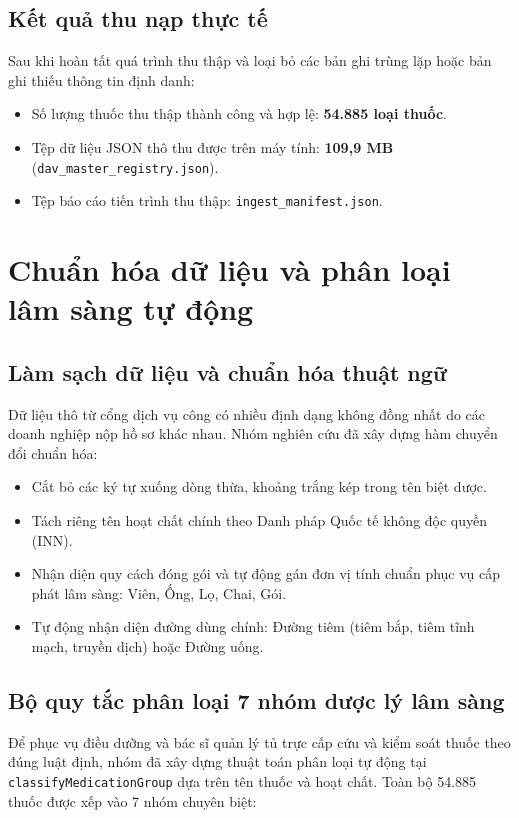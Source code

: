 \documentclass[12pt,a4paper]{article}
\begin{document}
\subsection{Kết quả thu nạp thực tế}
Sau khi hoàn tất quá trình thu thập và loại bỏ các bản ghi trùng lặp hoặc bản ghi thiếu thông tin định danh:
\begin{itemize}[leftmargin=1.5em]
    \item Số lượng thuốc thu thập thành công và hợp lệ: \textbf{54.885 loại thuốc}.
    \item Tệp dữ liệu JSON thô thu được trên máy tính: \textbf{109,9 MB} (\texttt{dav\_master\_registry.json}).
    \item Tệp báo cáo tiến trình thu thập: \texttt{ingest\_manifest.json}.
\end{itemize}

\section{Chuẩn hóa dữ liệu và phân loại lâm sàng tự động}

\subsection{Làm sạch dữ liệu và chuẩn hóa thuật ngữ}
Dữ liệu thô từ cổng dịch vụ công có nhiều định dạng không đồng nhất do các doanh nghiệp nộp hồ sơ khác nhau. Nhóm nghiên cứu đã xây dựng hàm chuyển đổi chuẩn hóa:
\begin{itemize}[leftmargin=1.5em]
    \item Cắt bỏ các ký tự xuống dòng thừa, khoảng trắng kép trong tên biệt dược.
    \item Tách riêng tên hoạt chất chính theo Danh pháp Quốc tế không độc quyền (INN).
    \item Nhận diện quy cách đóng gói và tự động gán đơn vị tính chuẩn phục vụ cấp phát lâm sàng: Viên, Ống, Lọ, Chai, Gói.
    \item Tự động nhận diện đường dùng chính: Đường tiêm (tiêm bắp, tiêm tĩnh mạch, truyền dịch) hoặc Đường uống.
\end{itemize}

\subsection{Bộ quy tắc phân loại 7 nhóm dược lý lâm sàng}
Để phục vụ điều dưỡng và bác sĩ quản lý tủ trực cấp cứu và kiểm soát thuốc theo đúng luật định, nhóm đã xây dựng thuật toán phân loại tự động tại \texttt{classifyMedicationGroup} dựa trên tên thuốc và hoạt chất. Toàn bộ 54.885 thuốc được xếp vào 7 nhóm chuyên biệt:
\end{document}

